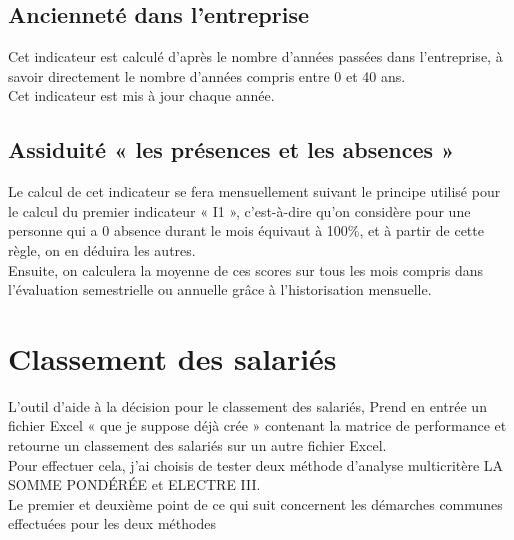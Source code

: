 \subsection{Ancienneté dans l'entreprise }
 Cet indicateur est calculé d’après le nombre d’années passées dans l’entreprise, à savoir directement le nombre d’années compris entre 0 et 40 ans.\\
Cet indicateur est mis à jour chaque année. 


\subsection{Assiduité « les présences et les absences »}
Le calcul de cet indicateur se fera mensuellement suivant le principe utilisé pour le calcul du premier indicateur « I1 », c’est-à-dire qu'on considère pour une personne qui a 0 absence durant le mois équivaut à 100\%, et à partir de cette règle, on en déduira les autres.\\
Ensuite, on calculera la moyenne de ces scores sur tous les mois compris dans l’évaluation semestrielle ou annuelle grâce à l’historisation mensuelle. 


\section{Classement des salariés }
L’outil d’aide à la décision pour le classement des salariés, Prend en entrée un fichier Excel « que je suppose déjà crée » contenant la matrice de performance et retourne un classement des salariés sur un autre fichier Excel.\\ 
Pour effectuer cela, j’ai choisis de tester deux méthode d’analyse multicritère LA SOMME PONDÉRÉE et ELECTRE III.\\

Le premier et deuxième point de ce qui suit concernent les démarches communes effectuées pour les deux méthodes

